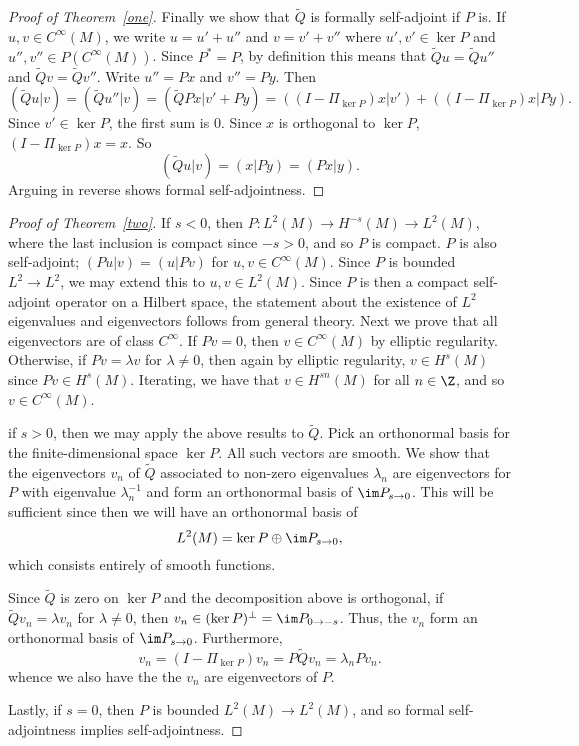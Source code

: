 \documentclass[12pt]{article}
\begin{document}
\begin{proof}[Proof of Theorem~\ref{one}]
Finally we show that $\tilde{Q}$ is formally self-adjoint if $P$ is. If $u,v \in C^\infty(M)$, we write $u = u'+u''$ and $v = v'+v''$ where $u',v' \in \ker P$ and $u'', v'' \in P(C^\infty(M))$. Since $P^\ast = P$, by definition this means that $\tilde{Q}u = \tilde{Q}u''$ and $\tilde{Q}v = \tilde{Q}v''$. Write $u'' = Px$ and $v'' = Py$. Then
\[(\tilde{Q}u|v) = (\tilde{Q}u''|v) = (\tilde{Q}Px|v' + Py) = ((I-\Pi_{\ker P})x|v') + ((I-\Pi_{\ker P})x|Py).\]
Since $v' \in \ker P$, the first sum is $0$. Since $x$ is orthogonal to $\ker P$, $(I-\Pi_{\ker P})x = x$. So
\[(\tilde{Q}u|v) = (x|Py) = (Px|y).\] Arguing in reverse shows formal self-adjointness.\end{proof}

\begin{proof}[Proof of Theorem~\ref{two}]If $s < 0$, then $P:L^2(M) \to H^{-s}(M) \to L^2(M)$, where the last inclusion is compact since $-s > 0$, and so $P$ is compact. $P$ is also self-adjoint; $(Pu|v) = (u|Pv)$ for $u,v \in C^\infty(M)$. Since $P$ is bounded $L^2 \to L^2$, we may extend this to $u,v \in L^2(M)$. Since $P$ is then a compact self-adjoint operator on a Hilbert space, the statement about the existence of $L^2$ eigenvalues and eigenvectors follows from general theory. Next we prove that all eigenvectors are of class $C^\infty$. If $Pv = 0$, then $v \in C^\infty(M)$ by elliptic regularity. Otherwise, if $Pv = \lambda v$ for $\lambda \neq 0$, then again by elliptic regularity, $v \in H^s(M)$ since $Pv \in H^s(M)$. Iterating, we have that $v \in H^{sn}(M)$ for all $n \in \Z$, and so $v \in C^\infty(M)$.

if $s > 0$, then we may apply the above results to $\tilde{Q}$. Pick an orthonormal basis for the finite-dimensional space $\ker P$. All such vectors are smooth. We show that the eigenvectors $v_n$ of $\tilde{Q}$ associated to non-zero eigenvalues $\lambda_n$ are eigenvectors for $P$ with eigenvalue $\lambda_n^{-1}$ and form an orthonormal basis of $\im P_{s\to 0}$. This will be sufficient since then we will have an orthonormal basis of 
\[L^2(M) = \ker P\oplus \im P_{s \to 0},\]
which consists entirely of smooth functions.

Since $\tilde{Q}$ is zero on $\ker P$ and the decomposition above is orthogonal, if $\tilde{Q}v_n = \lambda v_n$ for $\lambda \neq 0$, then $v_n \in (\ker P)^\bot = \im P_{0 \to -s}$. Thus, the $v_n$ form an orthonormal basis of $\im P_{s \to 0}$. Furthermore, \[v_n = (I-\Pi_{\ker P})v_n =  P\tilde{Q}v_n = \lambda_nPv_n.\] whence we also have the the $v_n$ are eigenvectors of $P$.

Lastly, if $s=0$, then $P$ is bounded $L^2(M) \to L^2(M)$, and so formal self-adjointness implies self-adjointness.\end{proof}
\end{document}
